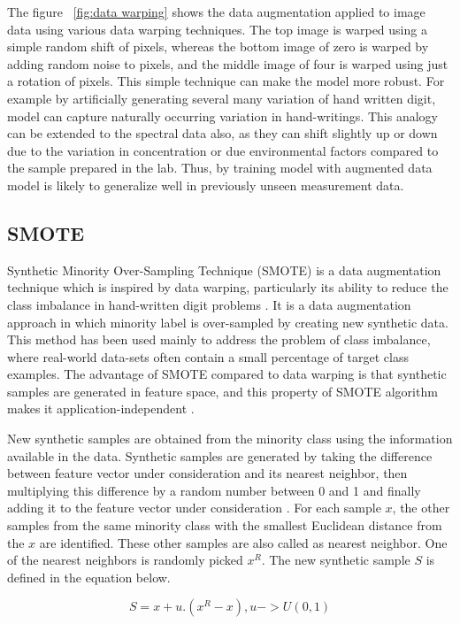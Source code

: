 The figure ~\ref{fig:data warping} shows the data augmentation applied to image data using various data warping techniques. The top image is warped using a simple random shift of pixels, whereas the bottom image of zero is warped by adding random noise to pixels, and the middle image of four is warped using just a rotation of pixels. This simple technique can make the model more robust. For example by artificially generating several many variation of hand written digit, model can capture naturally occurring variation in hand-writings. This analogy can be extended to the spectral data also, as they can shift slightly up or down due to the variation in concentration or due environmental factors compared to the sample prepared in the lab. Thus, by training model with augmented data model is likely to generalize well in previously unseen measurement data. 

\subsection{SMOTE}
Synthetic Minority Over-Sampling Technique (SMOTE) is a data augmentation technique which is inspired by data warping, particularly its ability to reduce the class imbalance in hand-written digit problems \citep{chawla2002smote}. It is a data augmentation approach in which minority label is over-sampled by creating new synthetic data. This method has been used mainly to address the problem of class imbalance, where real-world data-sets often contain a small percentage of target class examples. The advantage of SMOTE compared to data warping is that synthetic samples are generated in feature space, and this property of SMOTE algorithm makes it application-independent \citep{chawla2002smote}. 

New synthetic samples are obtained from the minority class using the information available in the data. Synthetic samples are generated by taking the difference between feature vector under consideration and its nearest neighbor, then multiplying this difference by a random number between 0 and 1 and finally adding it to the feature vector under consideration \citep{chawla2002smote}. For each sample $x$, the other samples from the same minority class with the smallest Euclidean distance from the $x$ are identified. These other samples are also called as nearest neighbor. One of the nearest neighbors is randomly picked $x^{R}$. The new synthetic sample $S$ is defined in the equation below.

\begin{equation}
S = x + u.(x^R-x), u -> U(0,1)
\end{equation}  

